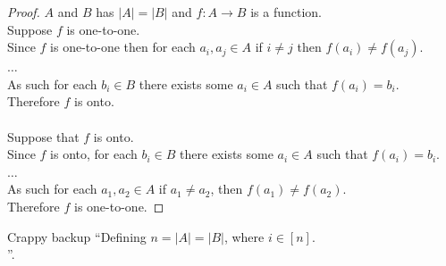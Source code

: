 \documentclass{article}
\theoremstyle{plain}
\begin{document}
\begin{proof}
    $A$ and $B$ has $|A| = |B|$ and $f: A \rightarrow B$ is a function.\\
    Suppose $f$ is one-to-one.\\
    Since $f$ is one-to-one then for each $a_{i}, a_{j} \in A$ if $i \neq j$ then $f(a_i) \neq f(a_j)$.\\
    $\dots$\\
    As such for each $b_i \in B$ there exists some $a_i \in A$ such that $f(a_i) = b_i$.\\
    Therefore $f$ is onto.\\
    \smallskip\\
    Suppose that $f$ is onto.\\
    Since $f$ is onto, for each $b_i \in B$ there exists some $a_i \in A$ such that $f(a_i) = b_i$.\\
    $\dots$\\
    As such for each $a_1, a_2 \in A$ if $a_1 \neq a_2$, then $f(a_1) \neq f(a_2)$.\\
    Therefore $f$ is one-to-one.
\end{proof}

Crappy backup ``Defining $n = |A| = |B|$, where $i \in [n]$.\\''.
\end{document}
